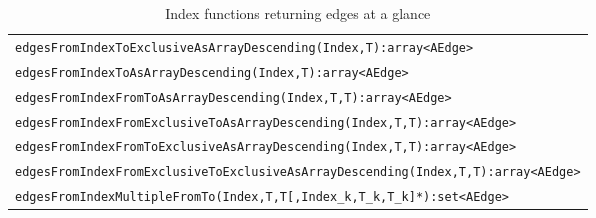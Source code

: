 \begin{table}[htbp]
\begin{tabular}{|l|}
\texttt{edgesFromIndexToExclusiveAsArrayDescending(Index,T):array<AEdge>}\\
\texttt{edgesFromIndexToAsArrayDescending(Index,T):array<AEdge>}\\
\texttt{edgesFromIndexFromToAsArrayDescending(Index,T,T):array<AEdge>}\\
\texttt{edgesFromIndexFromExclusiveToAsArrayDescending(Index,T,T):array<AEdge>}\\
\texttt{edgesFromIndexFromToExclusiveAsArrayDescending(Index,T,T):array<AEdge>}\\
\texttt{edgesFromIndexFromExclusiveToExclusiveAsArrayDescending(Index,T,T):array<AEdge>}\\
\hline
\texttt{edgesFromIndexMultipleFromTo(Index,T,T[,Index\_k,T\_k,T\_k]*):set<AEdge>}\\
\hline
\end{tabular}
\caption{Index functions returning edges at a glance}
\label{indexreturningedgestab}
\end{table}

\pagebreak

